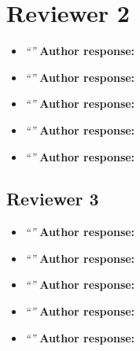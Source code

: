 \documentclass[10pt]{article} %
\begin{document}
\section*{Reviewer 2}

\begin{itemize}
	\item {\em ``''} \medskip
	\textbf{Author response:} \\
	
	\item {\em ``''} \medskip
	\textbf{Author response:} \\
	
	\item {\em ``''} \medskip
	\textbf{Author response:} \\
	
	\item {\em ``''} \medskip
	\textbf{Author response:} \\
	
	\item {\em ``''} \medskip
	\textbf{Author response:} \\		
\end{itemize}

\subsection*{Reviewer 3}

\begin{itemize}
	\item {\em ``''} \medskip
	\textbf{Author response:} \\
	
	\item {\em ``''} \medskip
	\textbf{Author response:} \\
	
	\item {\em ``''} \medskip
	\textbf{Author response:} \\
	
	\item {\em ``''} \medskip
	\textbf{Author response:} \\
	
	\item {\em ``''} \medskip
	\textbf{Author response:} \\		
\end{itemize}
\end{document}
